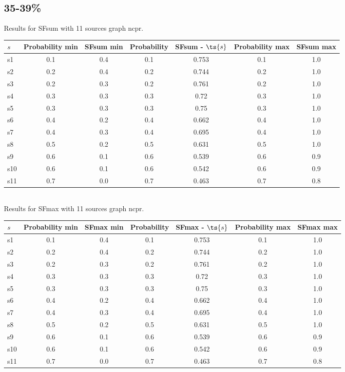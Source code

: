 \documentclass{article}
\begin{document}
\newpage

\subsection{35-39\%}

\noindent Results for SFsum with 11 sources graph ncpr.

\noindent\begin{tabular}{|l|c|c|c|c|c|c|}
\hline
$s$& Probability min & SFsum min & Probability & SFsum - $\ts{s}$ & Probability max & SFsum max\\
\hline
s1 &0.1 & 0.4 & 0.1 & 0.753 & 0.1 & 1.0\\
\hline
s2 &0.2 & 0.4 & 0.2 & 0.744 & 0.2 & 1.0\\
\hline
s3 &0.2 & 0.3 & 0.2 & 0.761 & 0.2 & 1.0\\
\hline
s4 &0.3 & 0.3 & 0.3 & 0.72 & 0.3 & 1.0\\
\hline
s5 &0.3 & 0.3 & 0.3 & 0.75 & 0.3 & 1.0\\
\hline
s6 &0.4 & 0.2 & 0.4 & 0.662 & 0.4 & 1.0\\
\hline
s7 &0.4 & 0.3 & 0.4 & 0.695 & 0.4 & 1.0\\
\hline
s8 &0.5 & 0.2 & 0.5 & 0.631 & 0.5 & 1.0\\
\hline
s9 &0.6 & 0.1 & 0.6 & 0.539 & 0.6 & 0.9\\
\hline
s10 &0.6 & 0.1 & 0.6 & 0.542 & 0.6 & 0.9\\
\hline
s11 &0.7 & 0.0 & 0.7 & 0.463 & 0.7 & 0.8\\
\hline
\end{tabular}\\

\noindent Results for SFmax with 11 sources graph ncpr.

\noindent\begin{tabular}{|l|c|c|c|c|c|c|}
\hline
$s$& Probability min & SFmax min & Probability & SFmax - $\ts{s}$ & Probability max & SFmax max\\
\hline
s1 &0.1 & 0.4 & 0.1 & 0.753 & 0.1 & 1.0\\
\hline
s2 &0.2 & 0.4 & 0.2 & 0.744 & 0.2 & 1.0\\
\hline
s3 &0.2 & 0.3 & 0.2 & 0.761 & 0.2 & 1.0\\
\hline
s4 &0.3 & 0.3 & 0.3 & 0.72 & 0.3 & 1.0\\
\hline
s5 &0.3 & 0.3 & 0.3 & 0.75 & 0.3 & 1.0\\
\hline
s6 &0.4 & 0.2 & 0.4 & 0.662 & 0.4 & 1.0\\
\hline
s7 &0.4 & 0.3 & 0.4 & 0.695 & 0.4 & 1.0\\
\hline
s8 &0.5 & 0.2 & 0.5 & 0.631 & 0.5 & 1.0\\
\hline
s9 &0.6 & 0.1 & 0.6 & 0.539 & 0.6 & 0.9\\
\hline
s10 &0.6 & 0.1 & 0.6 & 0.542 & 0.6 & 0.9\\
\hline
s11 &0.7 & 0.0 & 0.7 & 0.463 & 0.7 & 0.8\\
\hline
\end{tabular}\\
\end{document}
